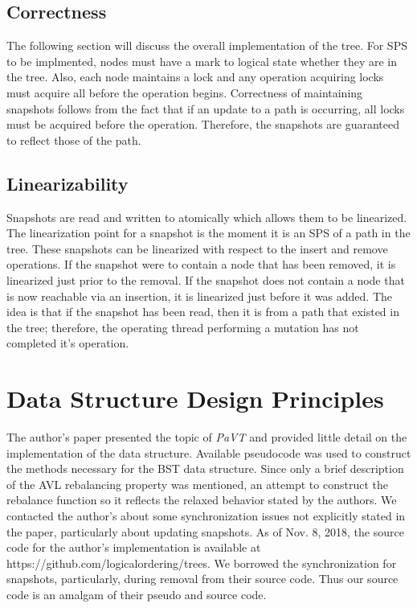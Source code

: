 \documentclass[conference]{IEEEtran}
\theoremstyle{definition}
\theoremstyle{theorem}
\begin{document}
\subsection{Correctness}
The following section will discuss the overall implementation of the tree. For SPS to be implmented, nodes must have a mark to logical state whether they are in the tree. Also, each node maintains a lock and any operation acquiring locks must acquire all before the operation begins. Correctness of maintaining snapshots follows from the fact that if an update to a path is occurring, all locks must be acquired before the operation. Therefore, the snapshots are guaranteed to reflect those of the path. 

\subsection{Linearizability}
Snapshots are read and written to atomically which allows them to be linearized. The linearization point for a snapshot is the moment it is an SPS of a path in the tree. These snapshots can be linearized with respect to the insert and remove operations. If the snapshot were to contain a node that has been removed, it is linearized just prior to the removal. If the snapshot does not contain a node that is now reachable via an insertion, it is linearized just before it was added. The idea is that if the snapshot has been read, then it is from a path that existed in the tree; therefore, the operating thread performing a mutation has not completed it's operation. 
\section{Data Structure Design Principles}

The author's paper presented the topic of \textit{PaVT} and provided little detail on the implementation of the data structure. Available pseudocode was used to construct the methods necessary for the BST data structure. Since only a brief description of the AVL rebalancing property was mentioned, an attempt to construct the rebalance function so it reflects the relaxed behavior stated by the authors. We contacted the author's about some synchronization issues not explicitly stated in the paper, particularly about updating snapshots. As of Nov. 8, 2018, the source code for the author's implementation is available at {https://github.com/logicalordering/trees}. We borrowed the synchronization for snapshots, particularly, during removal from their source code. Thus our source code is an amalgam of their pseudo and source code. 
\end{document}
